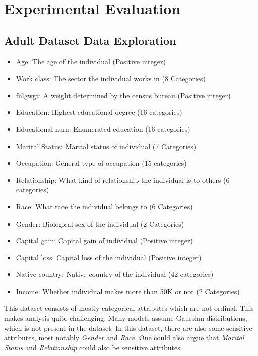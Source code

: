 
\chapter{Experimental Evaluation}
\label{ch:eval}

\section{Adult Dataset Data Exploration}
\label{sec:adult}

\begin{itemize}
    \item Age: The age of the individual (Positive integer)
    \item Work class: The sector the individual works in (8 Categories)
    \item fnlgwgt: A weight determined by the census bureau (Positive integer)
    \item Education: Highest educational degree (16 categories)
    \item Educational-num: Enumerated education (16 categories)
    \item Marital Status: Marital status of individual (7 Categories)
    \item Occupation: General type of occupation (15 categories)
    \item Relationship: What kind of relationship the individual is to others (6 categories)
    \item Race: What race the individual belongs to (6 Categories)
    \item Gender: Biological sex of the individual (2 Categories)
    \item Capital gain: Capital gain of individual (Positive integer)
    \item Capital loss: Capital loss of the individual (Positive integer)
    \item Native country: Native country of the individual (42 categories)
    \item Income: Whether individual makes more than 50K or not (2 Categories)
\end{itemize}

This dataset consists of mostly categorical attributes which are not ordinal. This makes analysis quite challenging. Many models assume Gaussian distributions, which is not present in the dataset. In this dataset, there are also some sensitive attributes, most notably \emph{Gender} and \emph{Race}. One could also argue that \emph{Marital Status} and \emph{Relationship} could also be sensitive attributes.

